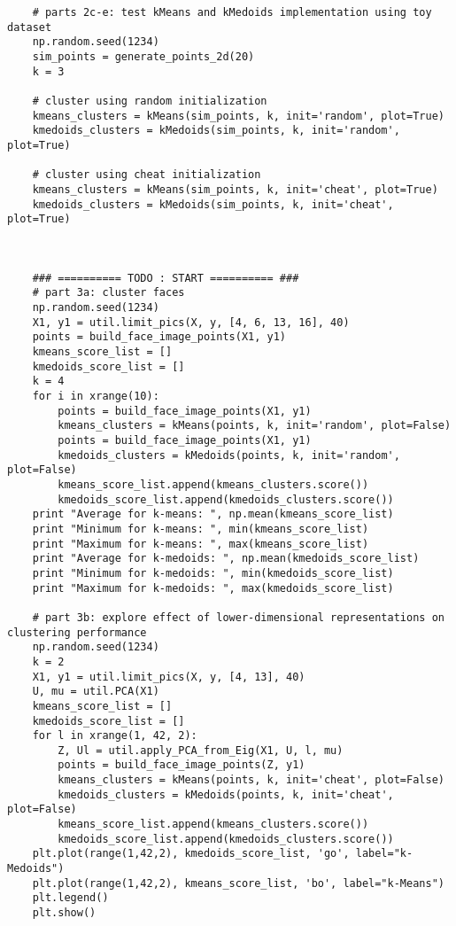 \documentclass[11pt]{article}
\begin{document}
\begin{verbatim}
    # parts 2c-e: test kMeans and kMedoids implementation using toy dataset
    np.random.seed(1234)
    sim_points = generate_points_2d(20)
    k = 3
    
    # cluster using random initialization
    kmeans_clusters = kMeans(sim_points, k, init='random', plot=True)
    kmedoids_clusters = kMedoids(sim_points, k, init='random', plot=True)
    
    # cluster using cheat initialization
    kmeans_clusters = kMeans(sim_points, k, init='cheat', plot=True)
    kmedoids_clusters = kMedoids(sim_points, k, init='cheat', plot=True)    
    
    
    
    ### ========== TODO : START ========== ###    
    # part 3a: cluster faces
    np.random.seed(1234)
    X1, y1 = util.limit_pics(X, y, [4, 6, 13, 16], 40)
    points = build_face_image_points(X1, y1)
    kmeans_score_list = []
    kmedoids_score_list = []
    k = 4
    for i in xrange(10):
        points = build_face_image_points(X1, y1)
        kmeans_clusters = kMeans(points, k, init='random', plot=False)
        points = build_face_image_points(X1, y1)
        kmedoids_clusters = kMedoids(points, k, init='random', plot=False) 
        kmeans_score_list.append(kmeans_clusters.score())
        kmedoids_score_list.append(kmedoids_clusters.score())
    print "Average for k-means: ", np.mean(kmeans_score_list)
    print "Minimum for k-means: ", min(kmeans_score_list)
    print "Maximum for k-means: ", max(kmeans_score_list)
    print "Average for k-medoids: ", np.mean(kmedoids_score_list)
    print "Minimum for k-medoids: ", min(kmedoids_score_list)
    print "Maximum for k-medoids: ", max(kmedoids_score_list)

    # part 3b: explore effect of lower-dimensional representations on clustering performance
    np.random.seed(1234)
    k = 2
    X1, y1 = util.limit_pics(X, y, [4, 13], 40)
    U, mu = util.PCA(X1)
    kmeans_score_list = []
    kmedoids_score_list = []
    for l in xrange(1, 42, 2):
        Z, Ul = util.apply_PCA_from_Eig(X1, U, l, mu)
        points = build_face_image_points(Z, y1)
        kmeans_clusters = kMeans(points, k, init='cheat', plot=False)
        kmedoids_clusters = kMedoids(points, k, init='cheat', plot=False) 
        kmeans_score_list.append(kmeans_clusters.score())
        kmedoids_score_list.append(kmedoids_clusters.score())
    plt.plot(range(1,42,2), kmedoids_score_list, 'go', label="k-Medoids")
    plt.plot(range(1,42,2), kmeans_score_list, 'bo', label="k-Means")
    plt.legend()
    plt.show()


\end{verbatim}
\end{document}
